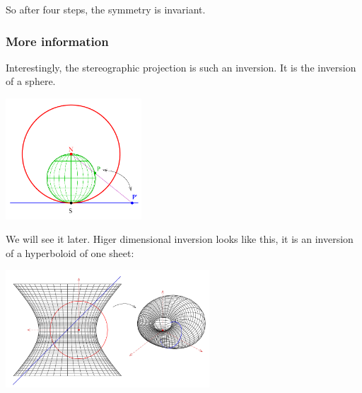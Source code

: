 \documentclass[]{ctexart}
\begin{document}
		So after four steps, the symmetry is invariant.
			\subsubsection{More information}
			Interestingly, the stereographic projection is such an inversion. It is the inversion of a sphere. 
				\begin{center}
					\includegraphics[width=2in, keepaspectratio]{pdfresizer-com-pdf-crop.pdf}
				\end{center}
			
			We will see it later. Higer dimensional inversion looks like this, it is an inversion of a hyperboloid of one sheet:
				\begin{center}
					\includegraphics[width=3in, keepaspectratio]{hyperinversion.pdf}
				\end{center}
			
\end{document}
